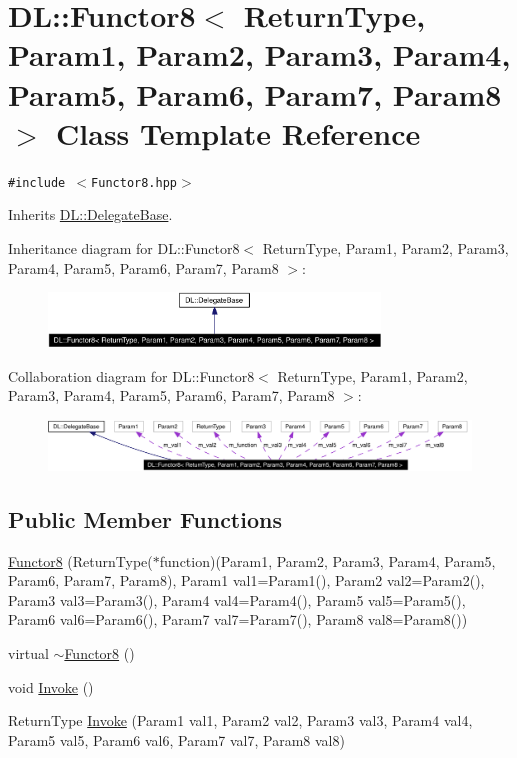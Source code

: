 \hypertarget{classDL_1_1Functor8}{
\section{DL::Functor8$<$ Return\-Type, Param1, Param2, Param3, Param4, Param5, Param6, Param7, Param8 $>$ Class Template Reference}
\label{classDL_1_1Functor8}
}
{\tt \#include $<$Functor8.hpp$>$}

Inherits \hyperlink{classDL_1_1DelegateBase}{DL::Delegate\-Base}.

Inheritance diagram for DL::Functor8$<$ Return\-Type, Param1, Param2, Param3, Param4, Param5, Param6, Param7, Param8 $>$:\begin{figure}[H]
\begin{center}
\leavevmode
\includegraphics[width=250pt]{classDL_1_1Functor8__inherit__graph}
\end{center}
\end{figure}
Collaboration diagram for DL::Functor8$<$ Return\-Type, Param1, Param2, Param3, Param4, Param5, Param6, Param7, Param8 $>$:\begin{figure}[H]
\begin{center}
\leavevmode
\includegraphics[width=390pt]{classDL_1_1Functor8__coll__graph}
\end{center}
\end{figure}
\subsection*{Public Member Functions}
\begin{CompactItemize}
\item 
\hyperlink{classDL_1_1Functor8_a0}{Functor8} (Return\-Type($\ast$function)(Param1, Param2, Param3, Param4, Param5, Param6, Param7, Param8), Param1 val1=Param1(), Param2 val2=Param2(), Param3 val3=Param3(), Param4 val4=Param4(), Param5 val5=Param5(), Param6 val6=Param6(), Param7 val7=Param7(), Param8 val8=Param8())
\item 
virtual \hyperlink{classDL_1_1Functor8_a1}{$\sim$Functor8} ()
\item 
void \hyperlink{classDL_1_1Functor8_a2}{Invoke} ()
\item 
Return\-Type \hyperlink{classDL_1_1Functor8_a3}{Invoke} (Param1 val1, Param2 val2, Param3 val3, Param4 val4, Param5 val5, Param6 val6, Param7 val7, Param8 val8)
\end{CompactItemize}
